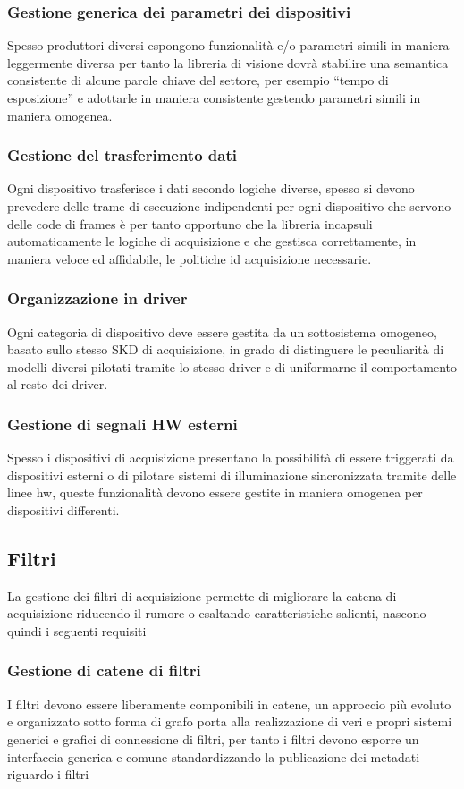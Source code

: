 \subsubsection{Gestione generica dei parametri dei dispositivi}
Spesso produttori diversi espongono funzionalità e/o parametri simili in maniera leggermente diversa per tanto la libreria di visione dovrà stabilire una semantica consistente di alcune parole chiave del settore, per esempio ``tempo di esposizione'' e adottarle in maniera consistente gestendo parametri simili in maniera omogenea.
\subsubsection{Gestione del trasferimento dati}
Ogni dispositivo trasferisce i dati secondo logiche diverse, spesso si devono prevedere delle trame di esecuzione indipendenti per ogni dispositivo che servono delle code di frames è per tanto opportuno che la libreria incapsuli automaticamente le logiche di acquisizione e che gestisca correttamente, in maniera veloce ed affidabile, le politiche id acquisizione necessarie.
\subsubsection{Organizzazione in driver}
Ogni categoria di dispositivo deve essere gestita da un sottosistema omogeneo, basato sullo stesso SKD di acquisizione, in grado di distinguere le peculiarità di modelli diversi pilotati tramite lo stesso driver e di uniformarne il comportamento al resto dei driver.
\subsubsection{Gestione di segnali HW esterni}
Spesso i dispositivi di acquisizione presentano la possibilità di essere triggerati da dispositivi esterni o di pilotare sistemi di illuminazione sincronizzata tramite delle linee hw, queste funzionalità devono essere gestite in maniera omogenea per dispositivi differenti.

\subsection{Filtri}
La gestione dei filtri di acquisizione permette di migliorare la catena di acquisizione riducendo il rumore o esaltando caratteristiche salienti, nascono quindi i seguenti requisiti

\subsubsection{Gestione di catene di filtri}
I filtri devono essere liberamente componibili in catene, un approccio più evoluto e organizzato sotto forma di grafo porta alla realizzazione di veri e propri sistemi generici e grafici di connessione di filtri, per tanto i filtri devono esporre un interfaccia generica e comune standardizzando la publicazione dei metadati riguardo i filtri

